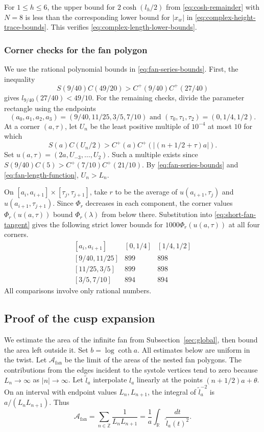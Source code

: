 \documentclass[10pt,twoside]{article}
\theoremstyle{plain}
\theoremstyle{definition}
\theoremstyle{remark}
\newcommand{\A}{\mathcal A}
\newcommand{\R}{\mathbb R}
\newcommand{\Z}{\mathbb Z}
\begin{document}
For $1\leq h\leq6$, the upper bound for $2\cosh(l_h/2)$ from
\eqref{eq:cosh-remainder} with $N=8$ is less than the corresponding
lower bound for $|x_w|$ in \eqref{eq:complex-height-trace-bounds}.
This verifies \eqref{eq:complex-length-lower-bounds}.

\subsubsection{Corner checks for the fan polygon}
\label{app:fan-interval-checks}

We use the rational polynomial bounds in \eqref{eq:fan-series-bounds}.
First, the inequality
$$
S(9/40)C(49/20)>C^+(9/40)C^+(27/40)
$$
gives $l_{9/40}(27/40)<49/10$. For the remaining checks, divide
the parameter rectangle using the endpoints
$$
(a_0,a_1,a_2,a_3)=(9/40,11/25,3/5,7/10)
\text{ and }(\tau_0,\tau_1,\tau_2)=(0,1/4,1/2).
$$
At a corner $(a,\tau)$, let $U_n$ be the least positive multiple
of $10^{-4}$ at most $10$ for which
$$
S(a)C(U_n/2)>C^+(a)C^+(|(n+1/2+\tau)a|).
$$
Set $u(a,\tau)=(2a,U_{-3},\ldots,U_2)$.
Such a multiple exists since
$S(9/40)C(5)>C^+(7/10)C^+(21/10)$. By
\eqref{eq:fan-series-bounds} and \eqref{eq:fan-length-function},
$U_n>L_n$.

On $[a_i,a_{i+1}]\times[\tau_j,\tau_{j+1}]$, take $r$ to be
the average of $u(a_{i+1},\tau_j)$ and $u(a_{i+1},\tau_{j+1})$.
Since $\Phi_r$ decreases in each component, the corner values
$\Phi_r(u(a,\tau))$ bound $\Phi_r(\lambda)$ from below there.
Substitution into \eqref{eq:short-fan-tangent} gives the following
strict lower bounds for $1000\Phi_r(u(a,\tau))$ at all four corners.
$$
\begin{array}{c|rr}
[a_i,a_{i+1}] & [0,1/4] & [1/4,1/2] \\ \hline
{[9/40,11/25]} & 899 & 898 \\
{[11/25,3/5]} & 899 & 898 \\
{[3/5,7/10]} & 894 & 894
\end{array}
$$
All comparisons involve only rational numbers.

\subsection{Proof of the cusp expansion}
\label{sec:cusp-growth}

We estimate the area of the infinite fan from
Subsection~\ref{sec:global}, then bound the area left outside it.
Set $b=\log\coth a$. All estimates below are uniform in the twist.
Let $\A_{\mathrm{fan}}$ be the limit of the areas of the nested fan polygons.
The contributions from the edges incident to the systole vertices
tend to zero because
$L_n\to\infty$ as $|n|\to\infty$.
Let $\widetilde l_a$ interpolate $l_a$ linearly at the points
$(n+1/2)a+\theta$. On an interval with endpoint values $L_n,L_{n+1}$,
the integral of $\widetilde l_a^{-2}$ is $a/(L_nL_{n+1})$. Thus
$$
\A_{\mathrm{fan}}=\sum_{n\in\Z}\frac1{L_nL_{n+1}}
=\frac1a\int_{\R}\frac{dt}{\widetilde l_a(t)^2}.
$$
\end{document}
